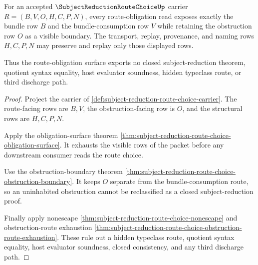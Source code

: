 \begin{theorem}
\label{thm:subject-reduction-route-choice-route-obligation-surface}
For an accepted $\SubjectReductionRouteChoiceUp$ carrier $R=(B,V,O,H,C,P,N)$, every route-obligation read exposes exactly the bundle row $B$ and the bundle-consumption row $V$ while retaining the obstruction row $O$ as a visible boundary. The transport, replay, provenance, and naming rows $H,C,P,N$ may preserve and replay only those displayed rows.

Thus the route-obligation surface exports no closed subject-reduction theorem, quotient syntax equality, host evaluator soundness, hidden typeclass route, or third discharge path.
\end{theorem}
\begin{proof}
Project the carrier of \autoref{def:subject-reduction-route-choice-carrier}. The route-facing rows are $B,V$, the obstruction-facing row is $O$, and the structural rows are $H,C,P,N$.

Apply the obligation-surface theorem \autoref{thm:subject-reduction-route-choice-obligation-surface}. It exhausts the visible rows of the packet before any downstream consumer reads the route choice.

Use the obstruction-boundary theorem \autoref{thm:subject-reduction-route-choice-obstruction-boundary}. It keeps $O$ separate from the bundle-consumption route, so an uninhabited obstruction cannot be reclassified as a closed subject-reduction proof.

Finally apply nonescape \autoref{thm:subject-reduction-route-choice-nonescape} and obstruction-route exhaustion \autoref{thm:subject-reduction-route-choice-obstruction-route-exhaustion}. These rule out a hidden typeclass route, quotient syntax equality, host evaluator soundness, closed consistency, and any third discharge path.
\end{proof}

